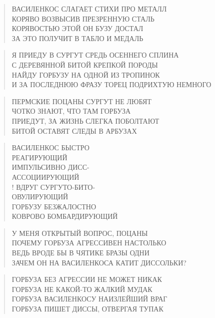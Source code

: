\poemtitle{***}
\begin{verse}
ВАСИЛЕНКОС СЛАГАЕТ СТИХИ ПРО МЕТАЛЛ\\
КОРЯВО ВОЗВЫСИВ ПРЕЗРЕННУЮ СТАЛЬ\\
КОРЯВОСТЬЮ ЭТОЙ ОН БУЗУ ДОСТАЛ\\
ЗА ЭТО ПОЛУЧИТ В ТАБЛО И МЕДАЛЬ
\end{verse}

\poemtitle{***}
\begin{verse}
Я ПРИЕДУ В СУРГУТ СРЕДЬ ОСЕННЕГО СПЛИНА\\
С ДЕРЕВЯННОЙ БИТОЙ КРЕПКОЙ ПОРОДЫ\\
НАЙДУ ГОРБУЗУ НА ОДНОЙ ИЗ ТРОПИНОК\\
И ЗА ПОСЛЕДНЮЮ ФРАЗУ ТОРЕЦ ПОДРИХТУЮ НЕМНОГО
\end{verse}

\poemtitle{***}
\begin{verse}
ПЕРМСКИЕ ПОЦАНЫ СУРГУТ НЕ ЛЮБЯТ\\
ЧОТКО ЗНАЮТ, ЧТО ТАМ ГОРБУЗА\\
ПРИЕДУТ, ЗА ЖИЗНЬ СЛЕГКА ПОБОЛТАЮТ\\
БИТОЙ ОСТАВЯТ СЛЕДЫ В АРБУЗАХ
\end{verse}

\poemtitle{***}
\begin{verse}
ВАСИЛЕНКОС БЫСТРО\\
РЕАГИРУЮЩИЙ\\
ИМПУЛЬСИВНО ДИСС-\\
АССОЦИИРУЮЩИЙ\\!
ВДРУГ СУРГУТО-БИТО-\\
ОВУЛИРУЮЩИЙ\\
ГОРБУЗУ БЕЗЖАЛОСТНО\\
КОВРОВО БОМБАРДИРУЮЩИЙ
\end{verse}

\poemtitle{***}
\begin{verse}
У МЕНЯ ОТКРЫТЫЙ ВОПРОС, ПОЦАНЫ\\
ПОЧЕМУ ГОРБУЗА АГРЕССИВЕН НАСТОЛЬКО\\
ВЕДЬ ВРОДЕ БЫ В ЧЯТИКЕ БРАЗЫ ОДНИ\\
ЗАЧЕМ ОН НА ВАСИЛЕНКОСА КАТИТ ДИССОЛЬКИ?
\end{verse}

\poemtitle{***}
\begin{verse}
ГОРБУЗА БЕЗ АГРЕССИИ НЕ МОЖЕТ НИКАК\\
ГОРБУЗА НЕ КАКОЙ-ТО ЖАЛКИЙ МУДАК\\
ГОРБУЗА ВАСИЛЕНКОСУ НАИЗЛЕЙШИЙ ВРАГ\\
ГОРБУЗА ПИШЕТ ДИССЫ, ОТВЕРГАЯ ТУПАК
\end{verse}

